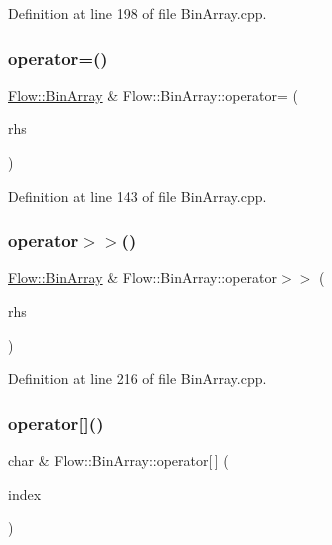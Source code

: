 Definition at line 198 of file Bin\+Array.\+cpp.

\hypertarget{class_flow_1_1_bin_array_a4c4c52bb282f728626b26ea3a1c3dbf2}{}\label{class_flow_1_1_bin_array_a4c4c52bb282f728626b26ea3a1c3dbf2} 
\subsubsection{\texorpdfstring{operator=()}{operator=()}}
{\footnotesize\ttfamily \hyperlink{class_flow_1_1_bin_array}{Flow\+::\+Bin\+Array} \& Flow\+::\+Bin\+Array\+::operator= (\begin{DoxyParamCaption}\item[{const \hyperlink{class_flow_1_1_bin_array}{Bin\+Array} \&}]{rhs }\end{DoxyParamCaption})}



Definition at line 143 of file Bin\+Array.\+cpp.

\hypertarget{class_flow_1_1_bin_array_a76be94c7c5f986d7ee31cd781c867d45}{}\label{class_flow_1_1_bin_array_a76be94c7c5f986d7ee31cd781c867d45} 
\subsubsection{\texorpdfstring{operator$>$$>$()}{operator>>()}}
{\footnotesize\ttfamily \hyperlink{class_flow_1_1_bin_array}{Flow\+::\+Bin\+Array} \& Flow\+::\+Bin\+Array\+::operator$>$$>$ (\begin{DoxyParamCaption}\item[{\hyperlink{class_flow_1_1_bin_array}{Bin\+Array} \&}]{rhs }\end{DoxyParamCaption})}



Definition at line 216 of file Bin\+Array.\+cpp.

\hypertarget{class_flow_1_1_bin_array_a87515820c4ed919c887f3e2bfafd4778}{}\label{class_flow_1_1_bin_array_a87515820c4ed919c887f3e2bfafd4778} 
\subsubsection{\texorpdfstring{operator[]()}{operator[]()}}
{\footnotesize\ttfamily char \& Flow\+::\+Bin\+Array\+::operator\mbox{[}$\,$\mbox{]} (\begin{DoxyParamCaption}\item[{unsigned int}]{index }\end{DoxyParamCaption})}



